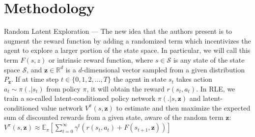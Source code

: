 \documentclass[10pt]{article} %
\begin{document}
\section{Methodology}
Random Latent Exploration --- The new idea that the authors \cite{rle-paper} present is to augment the reward function by adding a randomized term which incentivizes the agent to explore a larger portion of the state space. In particular, we will call this term $F(s, z)$ or intrinsic reward function, where $s \in \mathcal{S}$ is any state of the state space $\mathcal{S}$, and $\textbf{z} \in \mathbb{R}^{d}$ is a $d$-dimensional vector sampled from a given distribution $P_{\textbf{z}}$. If at time step $t \in \{0, 1, 2, ..., T\}$ the agent in state $s_{t}$ takes action $a_{t} \sim \pi(. | s_{t})$ from policy $\pi$, it will obtain the reward $r (s_{t}, a_{t})$. In \textsc{RLE}, we train a so-called latent-conditioned policy network $\pi(. | s, \textbf{z})$ and latent-conditioned value network $V^{\pi}(s, \textbf{z})$ to estimate and then maximize the expected sum of discounted rewards from a given state, aware of the random term $\textbf{z}$: $V^{\pi}(s, \textbf{z}) \approx \mathbb{E}_{\pi} \left[\sum_{t = 0}^{\infty} \gamma^{t} \left(r(s_{t}, a_{t}) + F(s_{t+1}, \textbf{z})\right) \right]$
\end{document}
